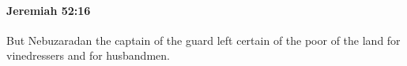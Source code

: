 
		\paragraph{Jeremiah 52:16} %
			\label{JEREMIAH-52-16}

			But Nebuzaradan the captain of the guard left certain of the poor of the land for vinedressers and for husbandmen.


